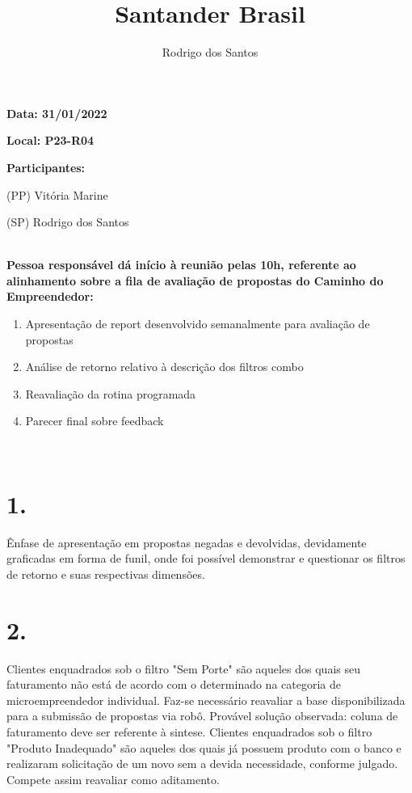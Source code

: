 \documentclass[a4paper, 11pt]{article}
\title{Santander Brasil}
\author{Rodrigo dos Santos}
\begin{document}
\pagestyle{style1}

\textbf{Data: 31/01/2022} %

\textbf{Local: P23-R04} %

\textbf{Participantes:} 
\begin{description}
\item (PP) Vitória Marine
\item (SP) Rodrigo dos Santos

\end{description}

\makebox[\linewidth]{\rule{\linewidth}{0.4pt}}\\
\textbf{Pessoa responsável dá início à reunião pelas 10h, referente ao alinhamento sobre a fila de avaliação de propostas do Caminho do Empreendedor:} 
\begin{enumerate}

\item Apresentação de report desenvolvido semanalmente para avaliação de propostas


\item Análise de retorno relativo à descrição dos filtros combo


\item Reavaliação da rotina programada

\item Parecer final sobre feedback


\end{enumerate}
\makebox[\linewidth]{\rule{\linewidth}{0.4pt}}\\

\section*{1.}
Ênfase de apresentação em propostas negadas e devolvidas, devidamente graficadas em forma de funil, onde foi possível demonstrar e questionar os filtros de retorno e suas respectivas dimensões.

\section*{2.}
Clientes enquadrados sob o filtro "Sem Porte" são aqueles dos quais seu faturamento não está de acordo com o determinado na categoria de microempreendedor individual. Faz-se necessário reavaliar a base disponibilizada para a submissão de propostas via robô. Provável solução observada: coluna de faturamento deve ser referente à sintese.
Clientes enquadrados sob o filtro "Produto Inadequado" são aqueles dos quais já possuem produto com o banco e realizaram solicitação de um novo sem a devida necessidade, conforme julgado. Compete assim reavaliar como aditamento.
\end{document}
